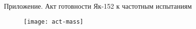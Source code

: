 
\begin{frame}{Приложение. Акт готовности Як-152 к частотным испытаниям}
	\centering
	\begin{figure}
		\texttt{[image: act-mass]}
	\end{figure}
\end{frame}